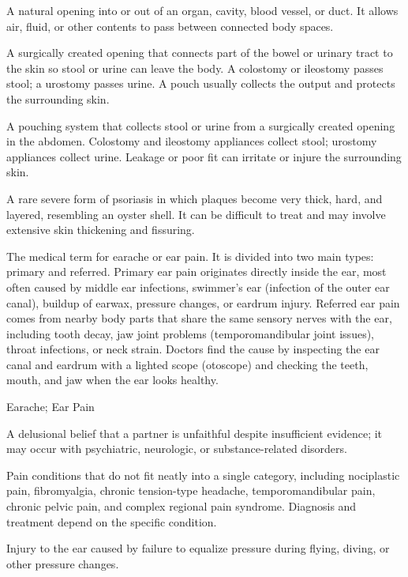  A natural opening into or out of an organ, cavity, blood vessel, or duct. It allows air, fluid, or other contents to pass between connected body spaces.

 A surgically created opening that connects part of the bowel or urinary tract to the skin so stool or urine can leave the body. A colostomy or ileostomy passes stool; a urostomy passes urine. A pouch usually collects the output and protects the surrounding skin.

 A pouching system that collects stool or urine from a surgically created opening in the abdomen. Colostomy and ileostomy appliances collect stool; urostomy appliances collect urine. Leakage or poor fit can irritate or injure the surrounding skin.

 A rare severe form of psoriasis in which plaques become very thick, hard, and layered, resembling an oyster shell. It can be difficult to treat and may involve extensive skin thickening and fissuring.

 The medical term for earache or ear pain. It is divided into two main types: primary and referred. Primary ear pain originates directly inside the ear, most often caused by middle ear infections, swimmer's ear (infection of the outer ear canal), buildup of earwax, pressure changes, or eardrum injury. Referred ear pain comes from nearby body parts that share the same sensory nerves with the ear, including tooth decay, jaw joint problems (temporomandibular joint issues), throat infections, or neck strain. Doctors find the cause by inspecting the ear canal and eardrum with a lighted scope (otoscope) and checking the teeth, mouth, and jaw when the ear looks healthy.

\synonyms
Earache; Ear Pain

 A delusional belief that a partner is unfaithful despite insufficient evidence; it may occur with psychiatric, neurologic, or substance-related disorders.

 Pain conditions that do not fit neatly into a single category, including nociplastic pain, fibromyalgia, chronic
tension-type headache, temporomandibular pain, chronic pelvic pain, and complex regional
pain syndrome. Diagnosis and treatment depend on the specific condition.

 Injury to the ear caused by failure to equalize pressure during flying, diving, or other pressure changes.


